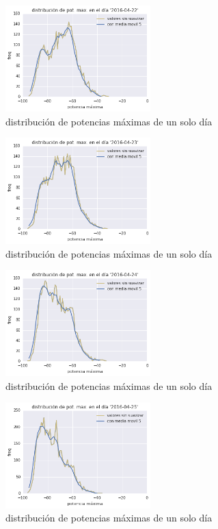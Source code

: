 \documentclass[12pt]{article}
\begin{document}
\begin{figure}[H] 
  \centering
  \includegraphics[width=0.5\textwidth]{../pot_max_2016-04-22.png}
  \caption{distribución de potencias máximas de un solo día}
\end{figure}

\begin{figure}[H] 
  \centering
  \includegraphics[width=0.5\textwidth]{../pot_max_2016-04-23.png}
  \caption{distribución de potencias máximas de un solo día}
\end{figure}

\begin{figure}[H] 
  \centering
  \includegraphics[width=0.5\textwidth]{../pot_max_2016-04-24.png}
  \caption{distribución de potencias máximas de un solo día}
\end{figure}

\begin{figure}[H] 
  \centering
  \includegraphics[width=0.5\textwidth]{../pot_max_2016-04-25.png}
  \caption{distribución de potencias máximas de un solo día}
\end{figure}
\end{document}
